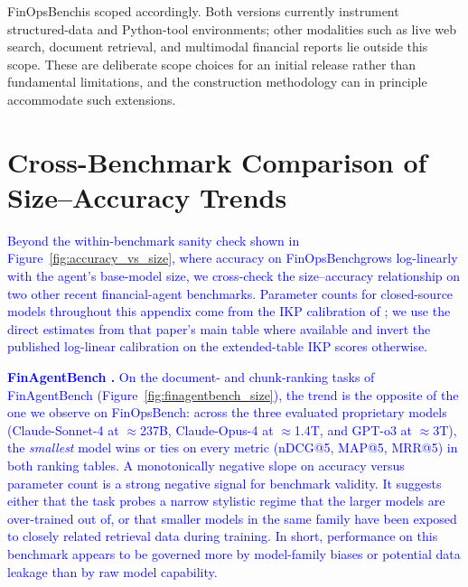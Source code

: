 \documentclass[11pt]{article}
\newcommand{\edit}[1]{\textcolor{blue}{#1}}
\newcommand{\editN}[1]{\textcolor{editgreen}{#1}}
\newcommand{\datasetname}{FinOpsBench}\xspace
\newcommand{\groundedfinqa}{FinOpsBench-v2}\xspace
\begin{document}
\editN{\datasetname is scoped accordingly. Both versions currently instrument structured-data and Python-tool environments; other modalities such as live web search, document retrieval, and multimodal financial reports lie outside this scope. These are deliberate scope choices for an initial release rather than fundamental limitations, and the construction methodology can in principle accommodate such extensions.}




\appendix

\section{Cross-Benchmark Comparison of Size--Accuracy Trends}
\label{app:cross_benchmark}

\edit{Beyond the within-benchmark sanity check shown in Figure~\ref{fig:accuracy_vs_size}, where accuracy on \datasetname grows log-linearly with the agent's base-model size, we cross-check the size--accuracy relationship on two other recent financial-agent benchmarks. Parameter counts for closed-source models throughout this appendix come from the IKP calibration of \citet{li2026incompressible}; we use the direct estimates from that paper's main table where available and invert the published log-linear calibration on the extended-table IKP scores otherwise.}

\noindent \textbf{\edit{FinAgentBench \citep{choi2025finagentbench}.}}
\edit{On the document- and chunk-ranking tasks of FinAgentBench (Figure~\ref{fig:finagentbench_size}), the trend is the opposite of the one we observe on \datasetname: across the three evaluated proprietary models (Claude-Sonnet-4 at $\approx$237B, Claude-Opus-4 at $\approx$1.4T, and GPT-o3 at $\approx$3T), the \emph{smallest} model wins or ties on every metric (nDCG@5, MAP@5, MRR@5) in both ranking tables. A monotonically negative slope on accuracy versus parameter count is a strong negative signal for benchmark validity. It suggests either that the task probes a narrow stylistic regime that the larger models are over-trained out of, or that smaller models in the same family have been exposed to closely related retrieval data during training. In short, performance on this benchmark appears to be governed more by model-family biases or potential data leakage than by raw model capability.}
\end{document}
